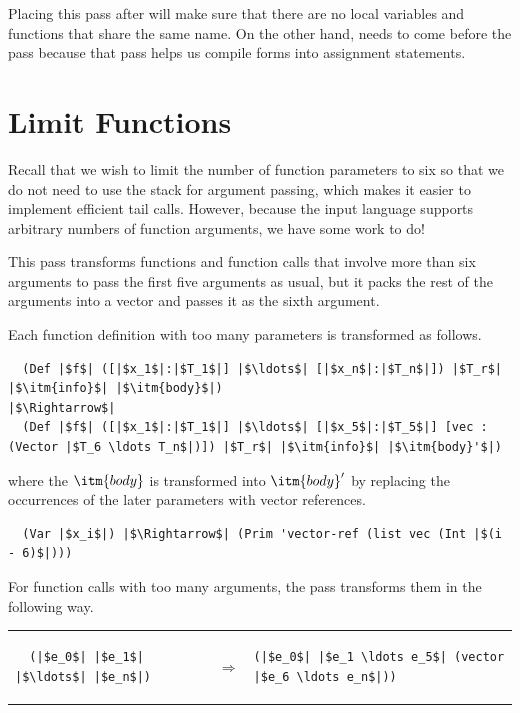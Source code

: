 \documentclass[11pt]{book}
\begin{document}

Placing this pass after  will make sure that there are
no local variables and functions that share the same name. On the
other hand,  needs to come before the
 pass because that pass helps us compile
 forms into assignment statements.

\section{Limit Functions}
\label{sec:limit-functions-r4}

Recall that we wish to limit the number of function parameters to six
so that we do not need to use the stack for argument passing, which
makes it easier to implement efficient tail calls.  However, because
the input language \LangFun{} supports arbitrary numbers of function
arguments, we have some work to do!

This pass transforms functions and function calls that involve more
than six arguments to pass the first five arguments as usual, but it
packs the rest of the arguments into a vector and passes it as the
sixth argument.

Each function definition with too many parameters is transformed as
follows.
\begin{lstlisting}
  (Def |$f$| ([|$x_1$|:|$T_1$|] |$\ldots$| [|$x_n$|:|$T_n$|]) |$T_r$| |$\itm{info}$| |$\itm{body}$|) 
|$\Rightarrow$|
  (Def |$f$| ([|$x_1$|:|$T_1$|] |$\ldots$| [|$x_5$|:|$T_5$|] [vec : (Vector |$T_6 \ldots T_n$|)]) |$T_r$| |$\itm{info}$| |$\itm{body}'$|) 
\end{lstlisting}
where the $\itm{body}$ is transformed into $\itm{body}'$ by replacing
the occurrences of the later parameters with vector references.
\begin{lstlisting}
  (Var |$x_i$|) |$\Rightarrow$| (Prim 'vector-ref (list vec (Int |$(i - 6)$|)))
\end{lstlisting}

For function calls with too many arguments, the 
pass transforms them in the following way.

\begin{tabular}{lll}
\begin{minipage}{0.2\textwidth}
\begin{lstlisting}
  (|$e_0$| |$e_1$| |$\ldots$| |$e_n$|) 
\end{lstlisting}
\end{minipage}
&
$\Rightarrow$
&
\begin{minipage}{0.4\textwidth}
\begin{lstlisting}
(|$e_0$| |$e_1 \ldots e_5$| (vector |$e_6 \ldots e_n$|))
\end{lstlisting}
\end{minipage}
\end{tabular}
\end{document}
